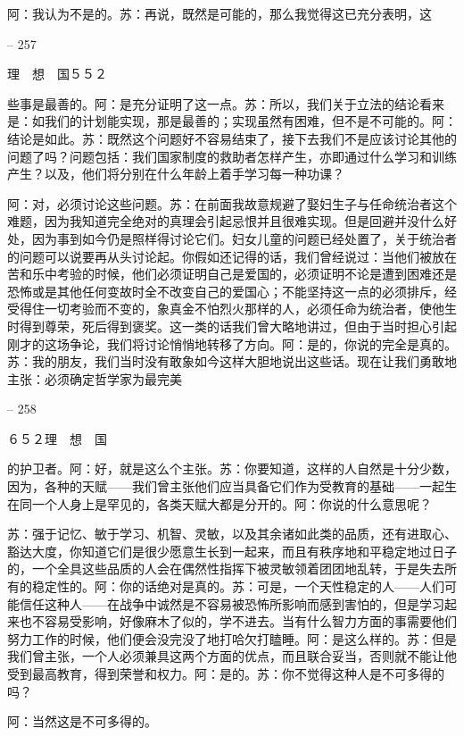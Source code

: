 \documentclass[11pt,oneside]{book}
\begin{document}
\begin{common-format}
    阿：我认为不是的。苏：再说，既然是可能的，那么我觉得这已充分表明，这

    

-- 257

    理　想　国５５２

    些事是最善的。阿：是充分证明了这一点。苏：所以，我们关于立法的结论看来是：如我们的计划能实现，那是最善的；实现虽然有困难，但不是不可能的。阿：结论是如此。苏：既然这个问题好不容易结束了，接下去我们不是应该讨论其他的问题了吗？问题包括：我们国家制度的救助者怎样产生，亦即通过什么学习和训练产生？以及，他们将分别在什么年龄上着手学习每一种功课？

    阿：对，必须讨论这些问题。苏：在前面我故意规避了娶妇生子与任命统治者这个难题，因为我知道完全绝对的真理会引起忌恨并且很难实现。但是回避并没什么好处，因为事到如今仍是照样得讨论它们。妇女儿童的问题已经处置了，关于统治者的问题可以说要再从头讨论起。你假如还记得的话，我们曾经说过：当他们被放在苦和乐中考验的时候，他们必须证明自己是爱国的，必须证明不论是遭到困难还是恐怖或是其他任何变故时全不改变自己的爱国心；不能坚持这一点的必须排斥，经受得住一切考验而不变的，象真金不怕烈火那样的人，必须任命为统治者，使他生时得到尊荣，死后得到褒奖。这一类的话我们曾大略地讲过，但由于当时担心引起刚才的这场争论，我们将讨论悄悄地转移了方向。阿：是的，你说的完全是真的。苏：我的朋友，我们当时没有敢象如今这样大胆地说出这些话。现在让我们勇敢地主张：必须确定哲学家为最完美

    

-- 258

    ６５２理　想　国

    的护卫者。阿：好，就是这么个主张。苏：你要知道，这样的人自然是十分少数，因为，各种的天赋——我们曾主张他们应当具备它们作为受教育的基础——一起生在同一个人身上是罕见的，各类天赋大都是分开的。阿：你说的什么意思呢？

    苏：强于记忆、敏于学习、机智、灵敏，以及其余诸如此类的品质，还有进取心、豁达大度，你知道它们是很少愿意生长到一起来，而且有秩序地和平稳定地过日子的，一个全具这些品质的人会在偶然性指挥下被灵敏领着团团地乱转，于是失去所有的稳定性的。阿：你的话绝对是真的。苏：可是，一个天性稳定的人——人们可能信任这种人——在战争中诚然是不容易被恐怖所影响而感到害怕的，但是学习起来也不容易受影响，好像麻木了似的，学不进去。当有什么智力方面的事需要他们努力工作的时候，他们便会没完没了地打哈欠打瞌睡。阿：是这么样的。苏：但是我们曾主张，一个人必须兼具这两个方面的优点，而且联合妥当，否则就不能让他受到最高教育，得到荣誉和权力。阿：是的。苏：你不觉得这种人是不可多得的吗？

    阿：当然这是不可多得的。


\end{common-format}
\end{document}
